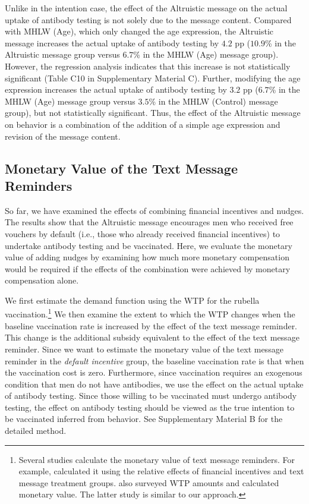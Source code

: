 \documentclass[
      12pt,
    a4paper
]{article}
\begin{document}
Unlike in the intention case, the effect of the Altruistic message on the actual uptake of antibody testing is not solely due to the message content. Compared with MHLW (Age), which only changed the age expression, the Altruistic message increases the actual uptake of antibody testing by \(4.2\) pp (\(10.9\)\% in the Altruistic message group versus \(6.7\)\% in the MHLW (Age) message group). However, the regression analysis indicates that this increase is not statistically significant (Table C10 in Supplementary Material C). Further, modifying the age expression increases the actual uptake of antibody testing by \(3.2\) pp (\(6.7\)\% in the MHLW (Age) message group versus \(3.5\)\% in the MHLW (Control) message group), but not statistically significant. Thus, the effect of the Altruistic message on behavior is a combination of the addition of a simple age expression and revision of the message content.

\hypertarget{monetary-value-of-the-text-message-reminders}{%
\subsection{Monetary Value of the Text Message Reminders}\label{monetary-value-of-the-text-message-reminders}}

So far, we have examined the effects of combining financial incentives and nudges. The results show that the Altruistic message encourages men who received free vouchers by default (i.e., those who already received financial incentives) to undertake antibody testing and be vaccinated. Here, we evaluate the monetary value of adding nudges by examining how much more monetary compensation would be required if the effects of the combination were achieved by monetary compensation alone.

We first estimate the demand function using the WTP for the rubella vaccination.\footnote{Several studies calculate the monetary value of text message reminders. For example, \citet{Bursztyn2019} calculated it using the relative effects of financial incentives and text message treatment groups. \citet{Moriwaki2020} also surveyed WTP amounts and calculated monetary value. The latter study is similar to our approach.} We then examine the extent to which the WTP changes when the baseline vaccination rate is increased by the effect of the text message reminder. This change is the additional subsidy equivalent to the effect of the text message reminder. Since we want to estimate the monetary value of the text message reminder in the \emph{default incentive} group, the baseline vaccination rate is that when the vaccination cost is zero. Furthermore, since vaccination requires an exogenous condition that men do not have antibodies, we use the effect on the actual uptake of antibody testing. Since those willing to be vaccinated must undergo antibody testing, the effect on antibody testing should be viewed as the true intention to be vaccinated inferred from behavior. See Supplementary Material B for the detailed method.
\end{document}
